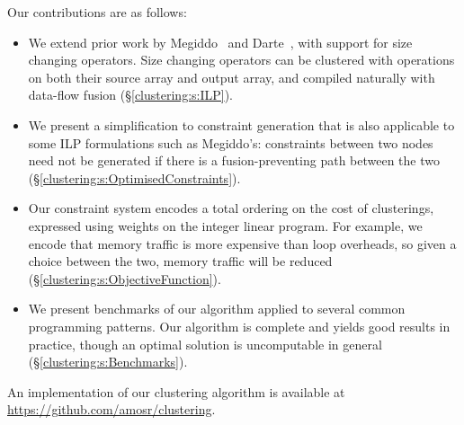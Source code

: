 Our contributions are as follows:
\begin{itemize}
\item   
We extend prior work by Megiddo~\cite{megiddo1998optimal} and Darte~\cite{darte2002contraction}, with support for size changing operators.
Size changing operators can be clustered with operations on both their source array and output array, and compiled naturally with data-flow fusion (\S\ref{clustering:s:ILP}).

\item
We present a simplification to constraint generation that is also applicable to some ILP formulations such as Megiddo's:
constraints between two nodes need not be generated if there is a fusion-preventing path between the two (\S\ref{clustering:s:OptimisedConstraints}).

\item
Our constraint system encodes a total ordering on the cost of clusterings, expressed using weights on the integer linear program.
For example, we encode that memory traffic is more expensive than loop overheads, so given a choice between the two, memory traffic will be reduced (\S\ref{clustering:s:ObjectiveFunction}).

\item
We present benchmarks of our algorithm applied to several common programming patterns.
Our algorithm is complete and yields good results in practice, though an optimal solution is uncomputable in general (\S\ref{clustering:s:Benchmarks}).
\end{itemize}

An implementation of our clustering algorithm is available at \url{https://github.com/amosr/clustering}.



